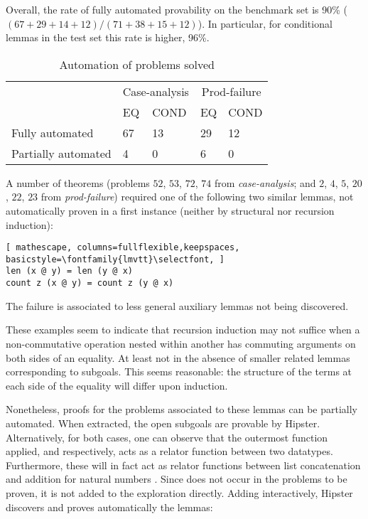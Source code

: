Overall, the rate of fully automated provability on the benchmark set is 90\% ($(67+29+14+12)/(71+38+15+12)$).
%
In particular, for conditional lemmas in the test set this rate is higher, 96\%.


\begin{table}
\begin{tabularx}{\textwidth}{l | X X | X X}
  & \multicolumn{2}{c|}{Case-analysis} & \multicolumn{2}{c}{Prod-failure} \\
  &  EQ & COND & EQ & COND \\
  \hline
  Fully automated & 67 & 13 & 29 & 12 \\
  Partially automated & 4 & 0 & 6 & 0 \\
\end{tabularx}
\caption{Automation of problems solved}
\label{tab:auto}
\end{table}


A number of theorems (problems $52$, $53$, $72$, $74$ from \emph{case-analysis}; and $2$, $4$, $5$, $20$, $22$, $23$ from \emph{prod-failure}) required one of the following two similar lemmas, not automatically proven in a first instance (neither by structural nor recursion induction):

\begin{lstlisting}[ mathescape, columns=fullflexible,keepspaces, basicstyle=\fontfamily{lmvtt}\selectfont, ]
len (x @ y) = len (y @ x)
count z (x @ y) = count z (y @ x)
\end{lstlisting}

\noindent The failure is associated to less general auxiliary lemmas not being discovered. %

These examples seem to indicate that recursion induction may not suffice when a non-commutative operation nested within another has commuting arguments on both sides of an equality.
%
At least not in the absence of smaller related lemmas corresponding to subgoals.
%
This seems reasonable: the structure of the terms at each side of the equality will differ upon induction.

Nonetheless, proofs for the problems associated to these lemmas can be partially automated.
%
When extracted, the open subgoals are provable by Hipster.
%
Alternatively, for both cases, one can observe that the outermost function applied,  and  respectively, acts as a relator function between two datatypes.
%
Furthermore, these will in fact act as relator functions between list concatenation  and addition for natural numbers .
%
Since  does not occur in the problems to be proven, it is not added to the exploration directly.
%
Adding  interactively, Hipster discovers and proves automatically the lemmas:


